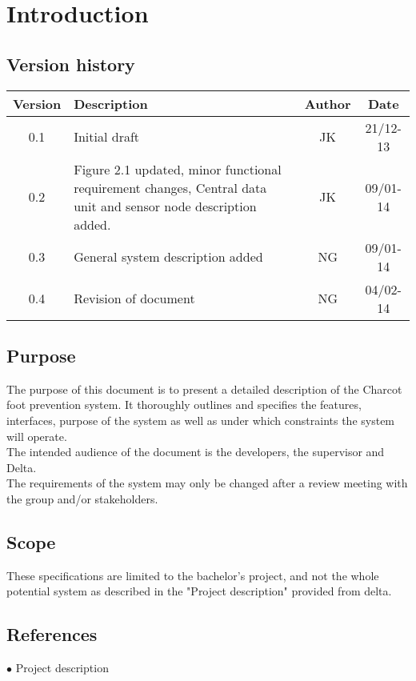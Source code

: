 \chapter{Introduction}
\section{Version history}
\begin{table}[H]
\begin{tabular}{|c|p{9cm}|c|c|}
\hline
Version & Description & Author & Date\\
\hline
0.1 & Initial draft & JK & 21/12-13\\
\hline
0.2 & Figure 2.1 updated, minor functional requirement changes, Central data unit and sensor node description added. & JK & 09/01-14\\
\hline
0.3 & General system description added & NG & 09/01-14\\
\hline
0.4 & Revision of document & NG & 04/02-14\\
\hline
\end{tabular}
\end{table}

\section{Purpose}
The purpose of this document is to present a detailed description of the Charcot foot prevention system. It thoroughly outlines and specifies the features, interfaces, purpose of the system as well as under which constraints the system will operate.\\
The intended audience of the document is the developers, the supervisor and Delta.\\
The requirements of the system may only be changed after a review meeting with the group and/or stakeholders.\\

\section{Scope}
These specifications are limited to the bachelor's project, and not the whole potential system as described in the "Project description" provided from delta.\\

\section{References}
$\bullet$ Project description

